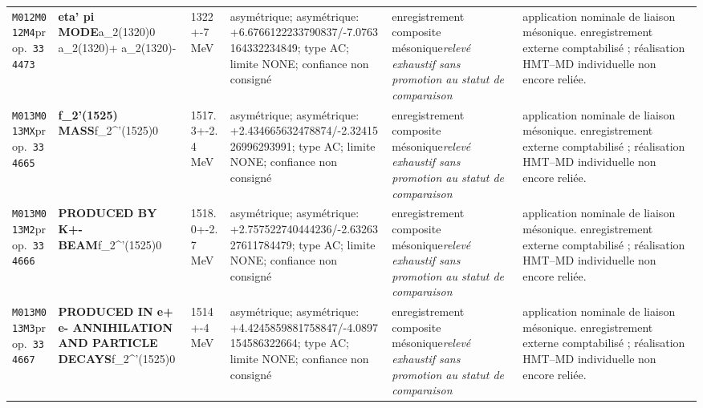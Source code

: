 \begin{landscape}
\begin{longtable}{L{1.85cm}L{4.45cm}L{2.35cm}L{4.05cm}L{3.35cm}L{7.15cm}}
\texttt{M012}\newline \texttt{M012M4}\newline prop.\ \texttt{334473} & \textbf{eta' pi MODE}\newline a\_\allowbreak{}2(1320)0 \textbar{}\allowbreak{} a\_\allowbreak{}2(1320)+ \textbar{}\allowbreak{} a\_\allowbreak{}2(1320)- & 1322+-7\,MeV & asymétrique; asymétrique: +6.6766122233790837/-7.0763164332234849; type AC; limite NONE; confiance non consigné & enregistrement composite mésonique\newline \emph{relevé exhaustif sans promotion au statut de comparaison} & application nominale de liaison mésonique. enregistrement externe comptabilisé ; réalisation HMT--MD individuelle non encore reliée. \\
\texttt{M013}\newline \texttt{M013MX}\newline prop.\ \texttt{334665} & \textbf{f\_\allowbreak{}2'(1525) MASS}\newline f\_\allowbreak{}2\textasciicircum{}'(1525)0 & 1517.3+-2.4\,MeV & asymétrique; asymétrique: +2.434665632478874/-2.3241526996293991; type AC; limite NONE; confiance non consigné & enregistrement composite mésonique\newline \emph{relevé exhaustif sans promotion au statut de comparaison} & application nominale de liaison mésonique. enregistrement externe comptabilisé ; réalisation HMT--MD individuelle non encore reliée. \\
\texttt{M013}\newline \texttt{M013M2}\newline prop.\ \texttt{334666} & \textbf{PRODUCED BY K+- BEAM}\newline f\_\allowbreak{}2\textasciicircum{}'(1525)0 & 1518.0+-2.7\,MeV & asymétrique; asymétrique: +2.757522740444236/-2.6326327611784479; type AC; limite NONE; confiance non consigné & enregistrement composite mésonique\newline \emph{relevé exhaustif sans promotion au statut de comparaison} & application nominale de liaison mésonique. enregistrement externe comptabilisé ; réalisation HMT--MD individuelle non encore reliée. \\
\texttt{M013}\newline \texttt{M013M3}\newline prop.\ \texttt{334667} & \textbf{PRODUCED IN e+ e- ANNIHILATION AND PARTICLE DECAYS}\newline f\_\allowbreak{}2\textasciicircum{}'(1525)0 & 1514+-4\,MeV & asymétrique; asymétrique: +4.4245859881758847/-4.0897154586322664; type AC; limite NONE; confiance non consigné & enregistrement composite mésonique\newline \emph{relevé exhaustif sans promotion au statut de comparaison} & application nominale de liaison mésonique. enregistrement externe comptabilisé ; réalisation HMT--MD individuelle non encore reliée. \\

\end{longtable}
\end{landscape}
